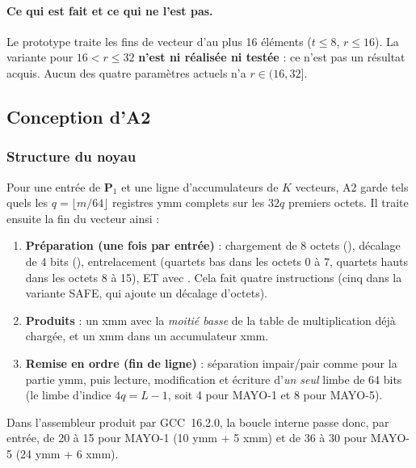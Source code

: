 \paragraph{Ce qui est fait et ce qui ne l'est pas.} Le prototype traite les fins de vecteur d'au plus 16 éléments ($t\le8$, $r\le16$). La variante pour $16<r\le32$ \textbf{n'est ni réalisée ni testée} : ce n'est pas un résultat acquis. Aucun des quatre paramètres actuels n'a $r\in(16,32]$.

\subsection{Conception d'A2}
\subsubsection{Structure du noyau}
Pour une entrée de $\mathbf{P}_1$ et une ligne d'accumulateurs de $K$ vecteurs, A2 garde tels quels les $q=\lfloor m/64\rfloor$ registres ymm complets sur les $32q$ premiers octets. Il traite ensuite la fin du vecteur ainsi :
\begin{enumerate}[nosep]
\item \textbf{Préparation (une fois par entrée)} : chargement de 8 octets (), décalage de 4 bits (), entrelacement  (quartets bas dans les octets 0 à 7, quartets hauts dans les octets 8 à 15), ET avec . Cela fait quatre instructions (cinq dans la variante SAFE, qui ajoute un décalage d'octets).
\item \textbf{Produits} : un  xmm avec la \emph{moitié basse} de la table de multiplication déjà chargée, et un  xmm dans un accumulateur xmm.
\item \textbf{Remise en ordre (fin de ligne)} : séparation impair/pair comme pour la partie ymm, puis lecture, modification et écriture d'\emph{un seul} limbe de 64 bits (le limbe d'indice $4q=L-1$, soit 4 pour MAYO-1 et 8 pour MAYO-5).
\end{enumerate}
Dans l'assembleur produit par GCC~16.2.0, la boucle interne passe donc, par entrée, de 20 à 15  pour MAYO-1 (10 ymm + 5 xmm) et de 36 à 30 pour MAYO-5 (24 ymm + 6 xmm).


